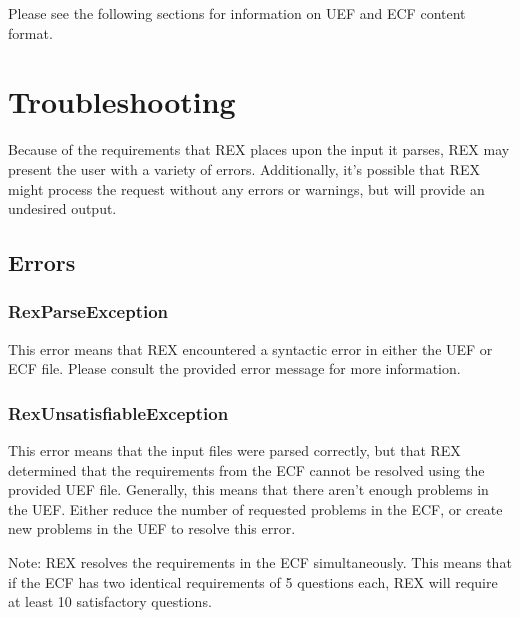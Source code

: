 \documentclass{article}
\begin{document}
Please see the following sections for information on UEF and ECF content format.

\section{Troubleshooting}
Because of the requirements that REX places upon the input it parses, REX may present the user with a variety of errors. Additionally, it's possible that REX might process the request without any errors or warnings, but will provide an undesired output.

\subsection{Errors}
\subsubsection{RexParseException}
This error means that REX encountered a syntactic error in either the UEF or ECF file. Please consult the provided error message for more information.

\subsubsection{RexUnsatisfiableException}
\label{RexUnsatisfiableException}
This error means that the input files were parsed correctly, but that
REX determined that the requirements from the ECF cannot be resolved
using the provided UEF file. Generally, this means that there aren't
enough problems in the UEF. Either reduce the number of requested
problems in the ECF, or create new problems in the UEF to resolve
this error.

Note: REX resolves the requirements in the ECF simultaneously. This means
that if the ECF has two identical requirements of 5 questions each, REX
will require at least 10 satisfactory questions.



\end{document}
